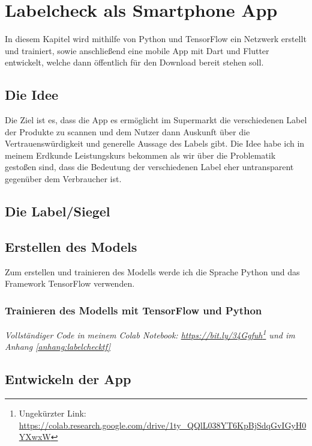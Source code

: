 \section{Labelcheck als Smartphone App}

In diesem Kapitel wird mithilfe von Python und TensorFlow ein Netzwerk erstellt und trainiert, sowie anschließend eine mobile App mit Dart und Flutter entwickelt, welche dann öffentlich für den Download bereit stehen soll.

\subsection{Die Idee}

Die Ziel ist es, dass die App es ermöglicht im Supermarkt die verschiedenen Label der Produkte zu scannen und dem Nutzer dann Auskunft über die Vertrauenswürdigkeit und generelle Aussage des Labels gibt. Die Idee habe ich in meinem Erdkunde Leistungskurs bekommen als wir über die Problematik gestoßen sind, dass die Bedeutung der verschiedenen Label eher untransparent gegenüber dem Verbraucher ist.

\subsection{Die Label/Siegel}

\subsection{Erstellen des Models}\label{erstellen des modells}

Zum erstellen und trainieren des Modells werde ich die Sprache Python und das Framework TensorFlow verwenden. 

\subsubsection{Trainieren des Modells mit TensorFlow und Python}

\emph{Vollständiger Code in meinem Colab Notebook: \url{https://bit.ly/34Ggfuh}\footnote{Ungekürzter Link: \url{https://colab.research.google.com/drive/1ty_QQlL038YT6KpBjSdqGvIGyH0YXwxW}} und im Anhang \ref{anhang:labelchecktf}}



\subsection{Entwickeln der App}

